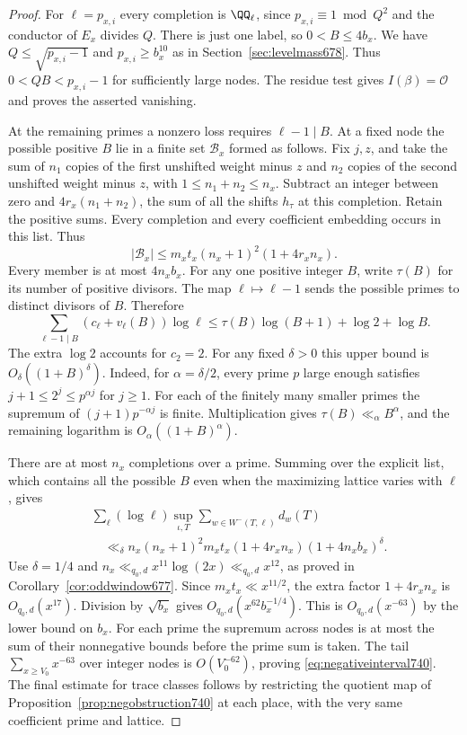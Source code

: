 \documentclass[a4paper,11pt]{article}
\theoremstyle{definition}
\theoremstyle{remark}
\numberwithin{equation}{section}
\begin{document}
\begin{proof}
For \(\ell=p_{x,i}\) every completion is \(\QQ_\ell\), since
\(p_{x,i}\equiv1\bmod Q^2\) and the conductor of \(E_x\)
divides \(Q\). There is just one label, so \(0<B\le 4b_x\).
We have \(Q\le\sqrt{p_{x,i}-1}\) and \(p_{x,i}\ge b_x^{10}\)
as in Section~\ref{sec:levelmass678}. Thus \(0<QB<p_{x,i}-1\)
for sufficiently large nodes. The residue test gives
\(I(\beta)=\mathcal O\) and proves the asserted vanishing.

At the remaining primes a nonzero loss requires \(\ell-1\mid B\).
At a fixed node the possible positive \(B\) lie in a finite set
\(\mathcal B_x\) formed as follows. Fix \(j,z\), and take the
sum of \(n_1\) copies of the first unshifted weight minus \(z\)
and \(n_2\) copies of the second unshifted weight minus \(z\),
with \(1\le n_1+n_2\le n_x\). Subtract an integer between zero
and \(4r_x(n_1+n_2)\), the sum of all the shifts \(h_\tau\)
at this completion. Retain the positive sums. Every completion
and every coefficient embedding occurs in this list. Thus
\[
   |\mathcal B_x|\le m_xt_x(n_x+1)^2(1+4r_xn_x).
\]
Every member is at most \(4n_xb_x\). For any one positive integer
\(B\), write \(\tau(B)\) for its number of positive divisors.
The map \(\ell\mapsto\ell-1\) sends the possible primes to
distinct divisors of \(B\). Therefore
\[
 \sum_{\ell-1\mid B}(c_\ell+v_\ell(B))\log\ell
       \le \tau(B)\log(B+1)+\log2+\log B .
\]
The extra \(\log2\) accounts for \(c_2=2\). For any fixed
\(\delta>0\) this upper bound is \(O_\delta((1+B)^\delta)\).
Indeed, for \(\alpha=\delta/2\), every prime \(p\) large
enough satisfies \(j+1\le2^j\le p^{\alpha j}\) for \(j\ge1\).
For each of the finitely many smaller primes the supremum of
\((j+1)p^{-\alpha j}\) is finite. Multiplication gives
\(\tau(B)\ll_\alpha B^\alpha\), and the remaining logarithm
is \(O_\alpha((1+B)^\alpha)\).

There are at most \(n_x\) completions over a prime. Summing over
the explicit list, which contains all the possible \(B\) even
when the maximizing lattice varies with \(\ell\), gives
\[
 \begin{split}
 &\sum_\ell(\log\ell)\sup_{\iota,T}\sum_{w\in W^-(T,\ell)}d_w(T)\\
 &\quad\ll_\delta n_x(n_x+1)^2m_xt_x(1+4r_xn_x)(1+4n_xb_x)^\delta .
 \end{split}
\]
Use \(\delta=1/4\) and \(n_x\ll_{q_0,d}x^{11}\log(2x)
\ll_{q_0,d}x^{12}\), as proved in
Corollary~\ref{cor:oddwindow677}. Since \(m_xt_x\ll x^{11/2}\),
the extra factor \(1+4r_xn_x\) is \(O_{q_0,d}(x^{17})\).
Division by \(\sqrt{b_x}\) gives \(O_{q_0,d}(x^{62}b_x^{-1/4})\).
This is \(O_{q_0,d}(x^{-63})\) by the lower bound on \(b_x\).
For each prime the supremum across nodes is at most the sum of
their nonnegative bounds before the prime sum is taken. The
tail \(\sum_{x\ge V_0}x^{-63}\) over integer nodes is
\(O(V_0^{-62})\), proving \eqref{eq:negativeinterval740}.
The final estimate for trace classes follows by restricting the
quotient map of Proposition~\ref{prop:negobstruction740} at
each place, with the very same coefficient prime and lattice.
\end{proof}
\end{document}
